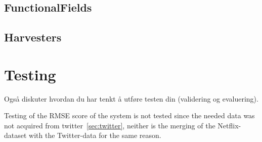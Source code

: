 \subsection{FunctionalFields}
\subsection{Harvesters}

\section{Testing}\label{impl:Testing}
Også diskuter hvordan du har tenkt å utføre testen din (validering og evaluering).

Testing of the RMSE score of the system is not tested since the needed data was not acquired from twitter~\ref{sec:twitter}, neither is the merging of the Netflix-dataset with the Twitter-data for the same reason.
